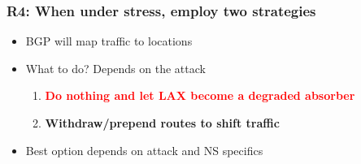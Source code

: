 \documentclass[11pt,show 
notes,notheorems,noamsthm,blank]{beamer} %
\begin{document}
\begin{frame}
 \frametitle{R4: When under stress, employ two strategies}
 \begin{figure}
\centering

  
  \label{fig:nl-deployment}

\end{figure}



\pause
\begin{itemize}
 \item BGP will map traffic to locations
 \item What to do? Depends on the attack
 \begin{enumerate}
   \item \textcolor{red}{\textbf{Do nothing and let LAX become a degraded 
absorber} }

\pause
   \item \textcolor{inlinks}{\textbf{Withdraw/prepend routes to shift traffic  }}

 \end{enumerate}
\pause
 \item Best option depends on attack and NS specifics
\end{itemize}


\end{frame}
\end{document}
